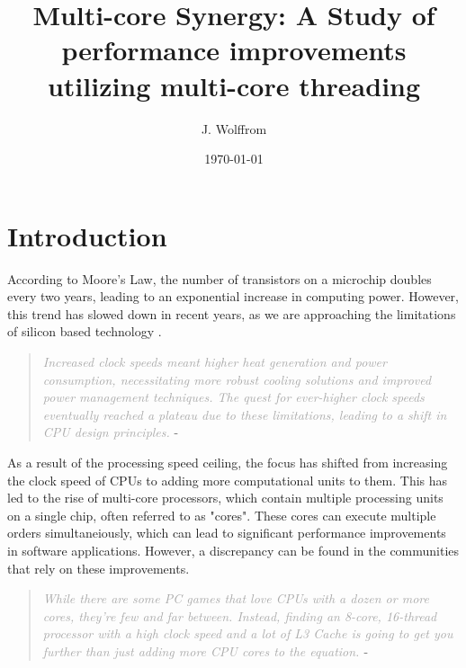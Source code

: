 \documentclass{article}
\title{Multi-core Synergy: A Study of performance improvements utilizing multi-core threading}
\author{J. Wolffrom}
\date{\today}
\begin{document}
 

\maketitle
\newpage

\begin{abstract}

\end{abstract}
\newpage

\tableofcontents

\newpage
\section{Introduction}

According to Moore's Law, the number of transistors on a microchip doubles every two years, leading to an exponential increase in computing power. However, this trend has slowed down in recent years, as we are approaching the limitations of silicon based technology \parencite{Mattson2014}.

\begin{quote}
    \textit{\textcolor{darkgray}{Increased clock speeds meant higher heat generation and power consumption, necessitating more robust cooling solutions and improved power management techniques. The quest for ever-higher clock speeds eventually reached a plateau due to these limitations, leading to a shift in CPU design principles.}} - \parencite{mscodes} 
\end{quote}

As a result of the processing speed ceiling, the focus has shifted from increasing the clock speed of CPUs to adding more computational units to them. This has led to the rise of multi-core processors, which contain multiple processing units on a single chip, often referred to as "cores". These cores can execute multiple orders simultaneiously, which can lead to significant performance improvements in software applications. However, a discrepancy can be found in the communities that rely on these improvements.

\begin{quote}
    \textit{\textcolor{darkgray}{While there are some PC games that love CPUs with a dozen or more cores, they’re few and far between. 
    Instead, finding an 8-core, 16-thread processor with a high clock speed and a lot of L3 Cache is going to get you further than just adding more CPU cores to the equation. }} 
    - \parencite{Thomas2025}
\end{quote}
\end{document}
